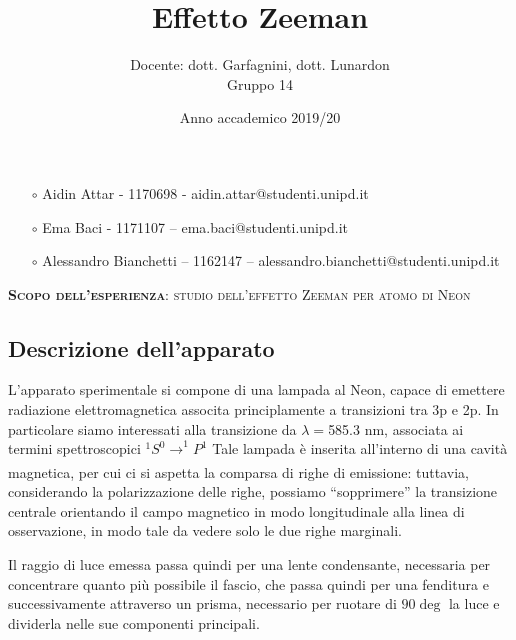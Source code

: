 \documentclass{article}
\title{Effetto Zeeman}
\author{Docente: dott. Garfagnini, dott. Lunardon \\
Gruppo 14}
\date{Anno accademico 2019/20}
\begin{document}
\maketitle

    \begin{itemize}
        \item[$\circ$] Aidin Attar - 1170698 - aidin.attar@studenti.unipd.it
        \item[$\circ$] Ema Baci - 1171107 – ema.baci@studenti.unipd.it
        \item[$\circ$] Alessandro Bianchetti – 1162147 – alessandro.bianchetti@studenti.unipd.it
    \end{itemize}

\vspace{3 cm}
\begin{large}\textsc{\textbf{Scopo dell'esperienza}: studio dell'effetto Zeeman per atomo di Neon} 
\end{large}
\vspace{8.5cm}



\twocolumn

\subsection*{Descrizione dell'apparato} 

L'apparato sperimentale si compone di una lampada al Neon, capace di emettere
radiazione elettromagnetica associta principlamente a transizioni tra 3p e 2p.
In particolare siamo interessati alla transizione da $\lambda = $585.3 nm, 
associata ai termini spettroscopici
$^1S^0 \xrightarrow[]{}  ^1P^1$ 
Tale lampada è inserita all'interno di una cavità magnetica, per cui ci si 
aspetta la comparsa di righe di emissione: tuttavia, considerando la 
polarizzazione delle righe, possiamo “sopprimere” la transizione centrale
orientando il campo magnetico in modo longitudinale alla linea di 
osservazione, in modo tale da vedere solo le due righe marginali. 

Il raggio di luce emessa passa quindi per una lente condensante, necessaria 
per concentrare quanto più possibile il fascio, che passa quindi per una 
fenditura e successivamente attraverso un prisma, necessario per ruotare di 
$90\deg$ la luce e dividerla nelle sue componenti principali. 
\end{document}
